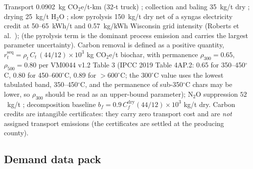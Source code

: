 Transport 0.0902~kg CO$_2$e/t-km (32-t truck) \cite{wernet2016}; collection and
baling
35~kg/t dry \cite{yue2014}; drying 25~kg/t H$_2$O
\cite{gebreegziabher2014,fagernas2010}; slow pyrolysis 150~kg/t dry net of a
syngas electricity credit at 50--65~kWh/t and 0.57~kg/kWh Wisconsin grid
intensity (Roberts et al.~\cite{roberts2010}); (the pyrolysis term is the dominant process
emission and carries the largest parameter uncertainty). Carbon removal is
defined as a positive quantity,
$r^{\mathrm{seq}}_t=\rho_t\,C_t\,(44/12)\times 10^{3}$ kg CO$_2$e/t biochar,
with permanence
$\rho_{300}=0.65$, $\rho_{500}=0.80$ per VM0044 v1.2 Table 3 (IPCC 2019
Table 4AP.2: 0.65 for 350--450$^\circ$C, 0.80 for 450--600$^\circ$C, 0.89 for
$>$600$^\circ$C; the 300$^\circ$C value uses the lowest tabulated band,
350--450$^\circ$C, and the permanence of sub-350$^\circ$C chars may be lower,
so $\rho_{300}$ should be read as an upper-bound parameter); N$_2$O suppression
$52$~kg/t \cite{cayuela2014};
decomposition baseline $b_f=0.9\,C_f^{\mathrm{dry}}(44/12)\times 10^{3}$
kg/t dry. Carbon credits are intangible certificates: they carry zero transport
cost and are \emph{not} assigned transport emissions (the certificates are
settled at the producing county).

\subsection{Demand data pack}

